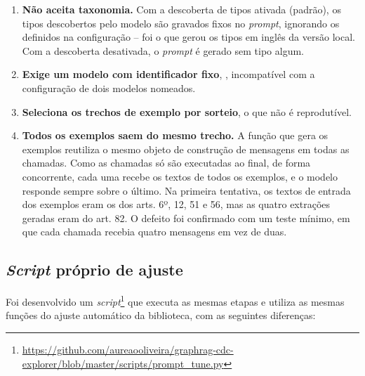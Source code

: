 \begin{enumerate}
    \item \textbf{Não aceita taxonomia.} Com a descoberta de tipos ativada (padrão), os tipos descobertos pelo modelo são gravados fixos no \textit{prompt}, ignorando os definidos na configuração -- foi o que gerou os tipos em inglês da versão local. Com a descoberta desativada, o \textit{prompt} é gerado sem tipo algum.
    \item \textbf{Exige um modelo com identificador fixo}, , incompatível com a configuração de dois modelos nomeados.
    \item \textbf{Seleciona os trechos de exemplo por sorteio}, o que não é reprodutível.
    \item \textbf{Todos os exemplos saem do mesmo trecho.} A função que gera os exemplos reutiliza o mesmo objeto de construção de mensagens em todas as chamadas. Como as chamadas só são executadas ao final, de forma concorrente, cada uma recebe os textos de todos os exemplos, e o modelo responde sempre sobre o último. Na primeira tentativa, os textos de entrada dos exemplos eram os dos arts. 6º, 12, 51 e 56, mas as quatro extrações geradas eram do art. 82. O defeito foi confirmado com um teste mínimo, em que cada chamada recebia quatro mensagens em vez de duas.
\end{enumerate}

\subsection{\textit{Script} próprio de ajuste}
\label{sec-indexacao-prompts-script}

Foi desenvolvido um \textit{script}\footnote{\url{https://github.com/aureaooliveira/graphrag-cdc-explorer/blob/master/scripts/prompt_tune.py}} que executa as mesmas etapas e utiliza as mesmas funções do ajuste automático da biblioteca, com as seguintes diferenças:

